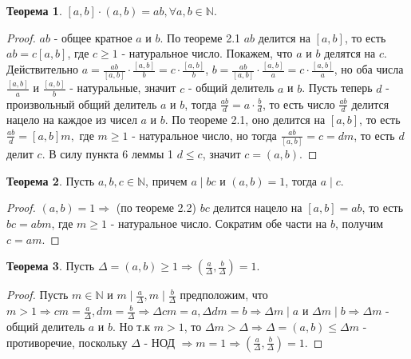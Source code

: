 \documentclass[a4paper, 12pt]{article}
\newcommand{\N}{\mathbb{N}}
\theoremstyle{definition}
\newtheorem{theorem}{Теорема}[section]
\begin{document}
    \begin{theorem}
        $[a,b]\cdot (a,b)=ab, \forall a,b \in \mathbb{N}$.
    \end{theorem}
    \begin{proof}
        $ab$ - общее кратное $a$ и $b$. По теореме 2.1 $ab$ делится на $[a,b]$, то есть $ab=c[a,b]$, где $c\geq 1$ - натуральное число. Покажем, что $a$ и $b$ делятся на $c$. Действительно $a=\frac{ab}{[a,b]}\cdot \frac{[a,b]}{b}=c\cdot \frac{[a,b]}{b}$, $b=\frac{ab}{[a,b]}\cdot \frac{[a,b]}{a}=c\cdot \frac{[a,b]}{a}$, но оба числа $\frac{[a,b]}{a}$ и $\frac{[a,b]}{b}$ - натуральные, значит $c$ - общий делитель $a$ и $b$. Пусть теперь $d$ - произвольный общий делитель $a$ и $b$, тогда $\frac{ab}{d}=a\cdot \frac{b}{d}$, то есть число $\frac{ab}{d}$ делится нацело на каждое из чисел $a$ и $b$. По теореме 2.1, оно делится на $[a,b]$, то есть $\frac{ab}{d}=[a,b]m, $ где $ m\geq 1$ - натуральное число, но тогда $\frac{ab}{[a,b]}=c=dm$, то есть $d$ делит $c$. В силу пункта 6 леммы 1 $d\leq c$, значит $c=(a,b)$.
    \end{proof}
    \begin{theorem}
        Пусть $a,b,c \in \mathbb{N}$, причем $a \mid bc$ и $(a,b)=1$, тогда $a \mid c$. 
    \end{theorem}
    \begin{proof}
        $(a,b)=1 \Rightarrow$ (по теореме 2.2) $bc$ делится нацело на $[a,b]=ab$, то есть $bc=abm$, где $m\geq 1$ - натуральное число. Сократим обе части на $b$, получим $c=am$. 
    \end{proof}
    \begin{theorem}
        Пусть $\Delta=(a,b)\geq 1 \Rightarrow (\frac{a}{\Delta}, \frac{b}{\Delta})=1$.
    \end{theorem} 
    \begin{proof}
        Пусть $m\in \N$ и $m \mid \frac{a}{\Delta}, m \mid \frac{b}{\Delta}$ предположим, что $m > 1 \Rightarrow cm=\frac{a}{\Delta},dm=\frac{b}{\Delta}\Rightarrow \Delta cm=a, \Delta dm=b \Rightarrow \Delta m \mid a$ и $\Delta m\mid b\Rightarrow \Delta m$ - общий делитель $a$ и $b$. Но т.к $m>1$, то $\Delta m>\Delta \Rightarrow \Delta=(a,b) \leq \Delta m$ - противоречие, поскольку $\Delta$ - НОД $\Rightarrow m=1\Rightarrow (\frac{a}{\Delta}, \frac{b}{\Delta})=1$.
    \end{proof} 
\end{document}
